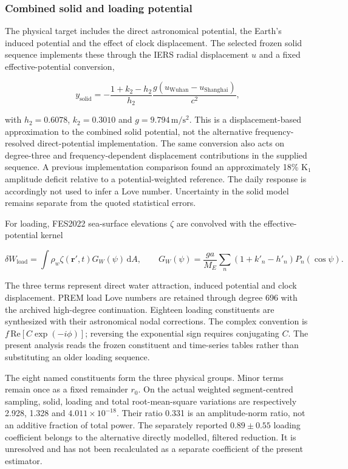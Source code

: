 \documentclass[
  10pt,
  a4paper,
]{article}
\begin{document}
\hypertarget{combined-solid-and-loading-potential}{%
\subsubsection{Combined solid and loading
potential}\label{combined-solid-and-loading-potential}}

The physical target includes the direct astronomical potential, the
Earth's induced potential and the effect of clock displacement. The
selected frozen solid sequence implements these through the IERS radial
displacement \(u\) and a fixed effective-potential conversion,

\[y_{\mathrm{solid}}=-\frac{1+k_2-h_2}{h_2}\frac{g(u_{\mathrm{Wuhan}}-u_{\mathrm{Shanghai}})}{c^2},\]

with \(h_2=0.6078\), \(k_2=0.3010\) and \(g=9.794\,\mathrm{m/s^2}\).
This is a displacement-based approximation to the combined solid
potential, not the alternative frequency-resolved direct-potential
implementation. The same conversion also acts on degree-three and
frequency-dependent displacement contributions in the supplied sequence.
A previous implementation comparison found an approximately 18\% K₁
amplitude deficit relative to a potential-weighted reference. The daily
response is accordingly not used to infer a Love number. Uncertainty in
the solid model remains separate from the quoted statistical errors.

For loading, FES2022 sea-surface elevations \(\zeta\) are convolved with
the effective-potential kernel

\[\delta W_{\mathrm{load}}=\int \rho_w\zeta(\mathbf{r}',t)G_W(\psi)\,\mathrm{d}A,\qquad
G_W(\psi)=\frac{ga}{M_E}\sum_n(1+k'_n-h'_n)P_n(\cos\psi).\]

The three terms represent direct water attraction, induced potential and
clock displacement. PREM load Love numbers are retained through degree
696 with the archived high-degree continuation. Eighteen loading
constituents are synthesized with their astronomical nodal corrections.
The complex convention is \(f\,\mathrm{Re}[C\exp(-i\phi)]\); reversing
the exponential sign requires conjugating \(C\). The present analysis
reads the frozen constituent and time-series tables rather than
substituting an older loading sequence.

The eight named constituents form the three physical groups. Minor terms
remain once as a fixed remainder \(r_0\). On the actual weighted
segment-centred sampling, solid, loading and total root-mean-square
variations are respectively 2.928, 1.328 and \(4.011\times10^{-18}\).
Their ratio 0.331 is an amplitude-norm ratio, not an additive fraction
of total power. The separately reported \(0.89\pm0.55\) loading
coefficient belongs to the alternative directly modelled, filtered
reduction. It is unresolved and has not been recalculated as a separate
coefficient of the present estimator.
\end{document}
